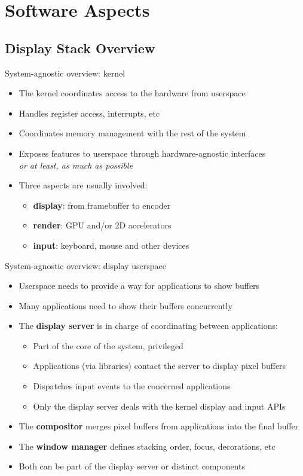 \section{Software Aspects}

\subsection{Display Stack Overview}

\begin{frame}{System-agnostic overview: kernel}
  \begin{itemize}
  \item The kernel coordinates access to the hardware from userspace
  \item Handles register access, interrupts, etc
  \item Coordinates memory management with the rest of the system
  \item Exposes features to userspace through hardware-agnostic interfaces\\
  \textit{or at least, as much as possible}
  \item Three aspects are usually involved:
    \begin{itemize}
    \item \textbf{display}: from framebuffer to encoder
    \item \textbf{render}: GPU and/or 2D accelerators
    \item \textbf{input}: keyboard, mouse and other devices
    \end{itemize}
  \end{itemize}
\end{frame}

\begin{frame}{System-agnostic overview: display userspace}
  \begin{itemize}
  \item Userspace needs to provide a way for applications to show buffers
  \item Many applications need to show their buffers concurrently
  \item The \textbf{display server} is in charge of coordinating between applications:
    \begin{itemize}
    \item Part of the core of the system, privileged
    \item Applications (via libraries) contact the server to display pixel buffers
    \item Dispatches input events to the concerned applications
    \item Only the display server deals with the kernel display and input APIs
    \end{itemize}
  \item The \textbf{compositor} merges pixel buffers from applications into the final buffer
  \item The \textbf{window manager} defines stacking order, focus, decorations, etc
  \item Both can be part of the display server or distinct components
  \end{itemize}
\end{frame}

